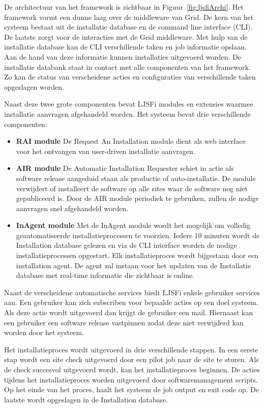 De architectuur van het framework is zichtbaar in Figuur~\vref{fig:ljsfiArchi}.
Het framework vormt een dunne laag over de middleware van Grid.
De kern van het systeem bestaat uit de installatie database en de command line interface (CLI).
De laatste zorgt voor de interacties met de Grid middleware.
Met hulp van de installatie database kan de CLI verschillende taken en job informatie opslaan.
Aan de hand van deze informatie kunnen installaties uitgevoerd worden.
De installatie databank staat in contact met alle componenten van het framework.
Zo kan de status van verscheidene acties en configuraties van verschillende taken opgeslagen worden.

Naast deze twee grote componenten bevat LJSFi modules en extensies waarmee installatie aanvragen afgehandeld worden.
Het systeem bevat drie verschillende componenten:
\begin{itemize}
\item \textbf{RAI module} De Request An Installation module dient als web interface voor het ontvangen van user-driven installatie aanvragen.
\item \textbf{AIR module} De Automatic Installation Requester schiet in actie als software release aangeduid staan als productie of auto-installatie.
De module verwijdert of installeert de software op alle sites waar de software nog niet gepubliceerd is.
Door de AIR module periodiek te gebruiken, zullen de nodige aanvragen snel afgehandeld worden.
\item \textbf{InAgent module} Met de InAgent module wordt het mogelijk om volledig geautomatiseerde installatieprocessen te voorzien.
Iedere 10 minuten wordt de Installation database gelezen en via de CLI interface worden de nodige installatieprocessen opgestart.
Elk installatieproces wordt bijgestaan door een installation agent.
De agent zal instaan voor het updaten van de Installatie database met real-time informatie die zichtbaar is online.
\end{itemize}

Naast de verscheidene automatische services biedt LJSFi enkele gebruiker services aan.
Een gebruiker kan zich subscriben voor bepaalde acties op een doel systeem.
Als deze actie wordt uitgevoerd dan krijgt de gebruiker een mail.
Hiernaast kan een gebruiker een software release vastpinnen zodat deze niet verwijderd kan worden door het systeem.

Het installatieproces wordt uitgevoerd in drie verschillende stappen.
In een eerste stap wordt een site check uitgevoerd door een pilot job naar de site te sturen.
Als de check succesvol uitgevoerd wordt, kan het installatieproces beginnen.
De acties tijdens het installatieproces worden uitgevoerd door softwaremanagement scripts.
Op het einde van het proces, haalt het systeem de job output en exit code op.
De laatste wordt opgeslagen in de Installation database.

